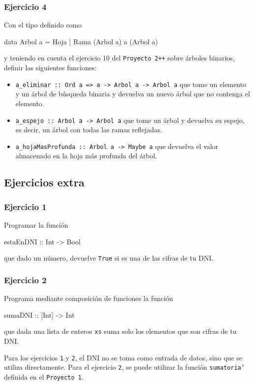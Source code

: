 \documentclass{article}
\begin{document}
\subsubsection{Ejercicio 4}
Con el tipo definido como
\begin{haskell}
data Arbol a = Hoja | Rama (Arbol a) a (Arbol a)
\end{haskell}
y teniendo en cuenta el ejercicio 10 del \texttt{Proyecto 2++} sobre árboles binarios, definir las siguientes funciones:
\begin{itemize}
    \item \texttt{a\_eliminar :: Ord a => a -> Arbol a -> Arbol a} que tome un elemento y un árbol de búsqueda binaria y devuelva un nuevo árbol que no contenga el elemento.
    \item \texttt{a\_espejo :: Arbol a -> Arbol a} que tome un árbol y devuelva su espejo, es decir, un árbol con todas las ramas reflejadas.
    \item \texttt{a\_hojaMasProfunda :: Arbol a -> Maybe a} que devuelva el valor almacenado en la hoja más profunda del árbol.
\end{itemize}

\newpage
\subsection{Ejercicios extra}

\subsubsection{Ejercicio 1}
Programar la función
\begin{haskell}
estaEnDNI :: Int -> Bool
\end{haskell}
que dado un número, devuelve \texttt{True} si es una de las cifras de tu DNI.

\subsubsection{Ejercicio 2}
Programa mediante composición de funciones la función 
\begin{haskell}
sumaDNI :: [Int] -> Int
\end{haskell}
que dada una lista de enteros \texttt{xs} suma solo los elementos que son cifras de tu DNI.

\begin{note}
    Para los ejercicios \texttt{1} y \texttt{2}, el DNI no se toma como entrada de datos, sino que se utiliza directamente.
    \newline Para el ejercicio \texttt{2}, se puede utilizar la función \texttt{sumatoria'} definida en el \texttt{Proyecto 1}.
\end{note}
\end{document}
